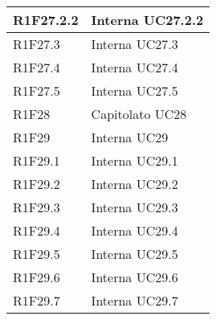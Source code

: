 \begin{center}
\begin{longtable}{|p{22mm}|p{44mm}|}
R1F27.2.2 &
Interna \newline
UC27.2.2 \newline
\\
\hline

R1F27.3 &
Interna \newline
UC27.3 \newline
\\
\hline

R1F27.4 &
Interna \newline
UC27.4 \newline
\\
\hline

R1F27.5 &
Interna \newline
UC27.5 \newline
\\
\hline

R1F28 &
Capitolato \newline
UC28 \newline
\\
\hline

R1F29 &
Interna \newline
UC29 \newline
\\
\hline

R1F29.1 &
Interna \newline
UC29.1 \newline
\\
\hline

R1F29.2 &
Interna \newline
UC29.2 \newline
\\
\hline

R1F29.3 &
Interna \newline
UC29.3 \newline
\\
\hline

R1F29.4 &
Interna \newline
UC29.4 \newline
\\
\hline

R1F29.5 &
Interna \newline
UC29.5 \newline
\\
\hline

R1F29.6 &
Interna \newline
UC29.6 \newline
\\
\hline

R1F29.7 &
Interna \newline
UC29.7 \newline
\\
\hline


\end{longtable}
\end{center}
